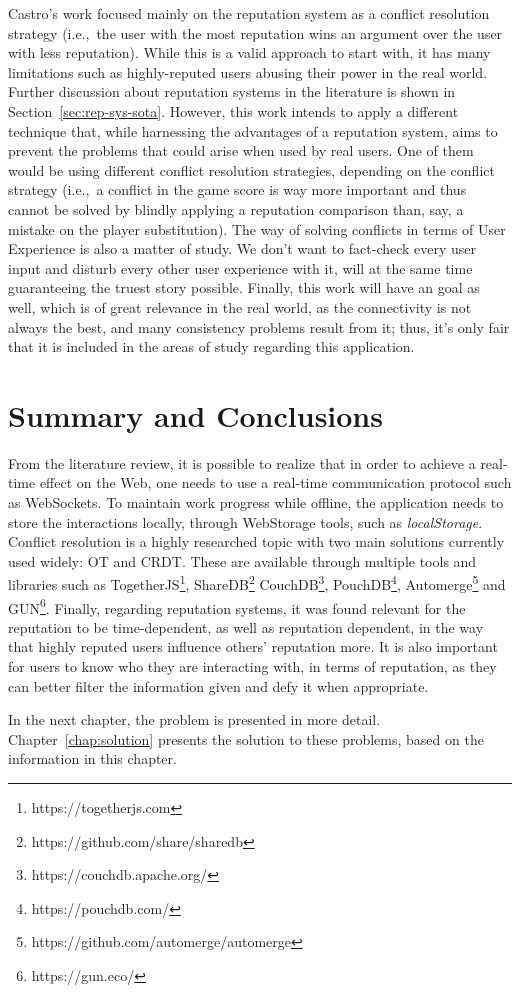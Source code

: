 Castro's work focused mainly on the reputation system as a conflict resolution strategy (i.e.,\ the user with the most reputation wins an argument over the user with less reputation). While this is a valid approach to start with, it has many limitations such as highly-reputed users abusing their power in the real world. Further discussion about reputation systems in the literature is shown in Section~\ref{sec:rep-sys-sota}. However, this work intends to apply a different technique that, while harnessing the advantages of a reputation system, aims to prevent the problems that could arise when used by real users. One of them would be using different conflict resolution strategies, depending on the conflict strategy (i.e.,\ a conflict in the game score is way more important and thus cannot be solved by blindly applying a reputation comparison than, say, a mistake on the player substitution). The way of solving conflicts in terms of User Experience is also a matter of study. We don't want to fact-check every user input and disturb every other user experience with it, will at the same time guaranteeing the truest story possible. Finally, this work will have an  goal as well, which is of great relevance in the real world, as the connectivity is not always the best, and many consistency problems result from it; thus, it's only fair that it is included in the areas of study regarding this application.

\section{Summary and Conclusions}

From the literature review, it is possible to realize that in order to achieve a real-time effect on the Web, one needs to use a real-time communication protocol such as WebSockets. To maintain work progress while offline, the application needs to store the interactions locally, through WebStorage tools, such as \textit{localStorage}. Conflict resolution is a highly researched topic with two main solutions currently used widely: OT and CRDT. These are available through multiple tools and libraries such as TogetherJS\footnote{https://togetherjs.com}, ShareDB\footnote{https://github.com/share/sharedb} CouchDB\footnote{https://couchdb.apache.org/}, PouchDB\footnote{https://pouchdb.com/}, Automerge\footnote{https://github.com/automerge/automerge} and GUN\footnote{https://gun.eco/}. Finally, regarding reputation systems, it was found relevant for the reputation to be time-dependent, as well as reputation dependent, in the way that highly reputed users influence others' reputation more. It is also important for users to know who they are interacting with, in terms of reputation, as they can better filter the information given and defy it when appropriate. 

In the next chapter, the problem is presented in more detail. Chapter~\ref{chap:solution} presents the solution to these problems, based on the information in this chapter. 
